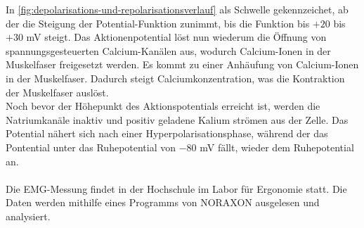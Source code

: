 In \autoref{fig:depolarisations-und-repolarisationsverlauf} als Schwelle gekennzeichet, ab der die Steigung der Potential-Funktion zunimmt, bis die Funktion bis $+20$ bis $+30$ mV steigt.
Das Aktionenpotential löst nun wiederum die Öffnung von spannungsgesteuerten Calcium-Kanälen aus, wodurch Calcium-Ionen in der Muskelfaser freigesetzt werden. Es kommt zu einer Anhäufung von Calcium-Ionen in der Muskelfaser. Dadurch steigt Calciumkonzentration, was die Kontraktion der Muskelfaser auslöst. \\
Noch bevor der Höhepunkt des Aktionspotentials erreicht ist, werden die Natriumkanäle inaktiv und positiv geladene Kalium strömen aus der Zelle. Das Potential nähert sich nach einer Hyperpolarisationsphase, während der das Pontential unter das Ruhepotential von $-80$ mV fällt, wieder dem Ruhepotential an.
\\
\\
Die EMG-Messung findet in der Hochschule im Labor für Ergonomie statt.
Die Daten werden mithilfe eines Programms von NORAXON ausgelesen und analysiert.


